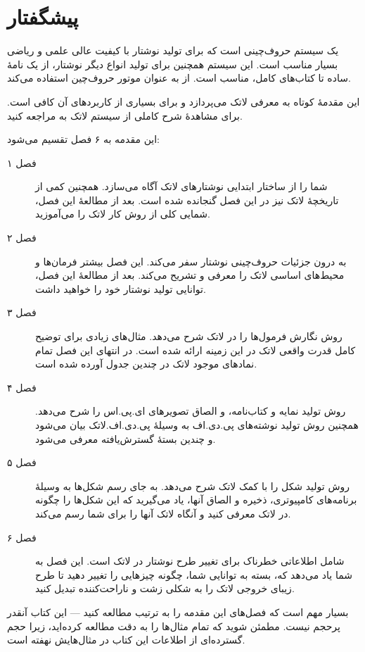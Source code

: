 

\chapter{پیشگفتار}

\lr{\LaTeX{}} \cite{manual}
یک سیستم حروف‌چینی است که برای تولید نوشتار‌‌ با کیفیت عالی علمی و ریاضی بسیار مناسب است. این سیستم همچنین برای تولید انواع دیگر نوشتار‌‌، از یک نامهٔ ساده تا کتاب‌های کامل، مناسب است. 
\lr{\LaTeX}
از 
\lr{\TeX} \cite{texbook}
به عنوان موتور حروف‌چین استفاده می‌کند.

این مقدمهٔ کوتاه به معرفی لاتک می‌پردازد و برای بسیاری از کاربردهای آن کافی است. برای مشاهدهٔ شرح کاملی از سیستم لاتک به 
\cite{manual,companion}
مراجعه کنید.

\bigskip
\noindent 
این مقدمه به ۶ فصل تقسیم می‌شود:
\begin{description}
\item[فصل ۱] 
شما را از ساختار ابتدایی نوشتارهای لاتک آگاه می‌سازد. همچنین کمی از تاریخچهٔ لاتک نیز در این فصل گنجانده شده است. بعد از مطالعهٔ این فصل، شمایی کلی از روش کار لاتک را می‌آموزید.
\item[فصل ۲] 
به درون جزئیات حروف‌چینی نوشتار سفر می‌کند. این فصل بیشتر فرمان‌ها و محیط‌های اساسی لاتک را معرفی و تشریح می‌کند. بعد از مطالعهٔ این فصل، توانایی تولید نوشتار خود را خواهید داشت.
\item[فصل ۳]
روش نگارش فرمول‌ها را در لاتک شرح می‌دهد. مثال‌های زیادی برای توضیح کامل قدرت واقعی لاتک در این زمینه ارائه شده است. در انتهای این فصل تمام نمادهای موجود لاتک  در چندین جدول آورده شده است.
\item[فصل ۴] 
روش تولید نمایه و کتاب‌نامه، و الصاق تصویر‌های ای.پی.اس را شرح می‌دهد. همچنین روش تولید نوشته‌های پی.دی.اف به وسیلهٔ پی.دی.اف.لاتک بیان می‌شود و چندین بستهٔ گسترش‌یافته معرفی می‌شود. 
\item[فصل ۵] 
روش تولید شکل‌ را با کمک لاتک شرح می‌دهد. به جای رسم شکل‌ها به وسیلهٔ برنامه‌های کامپیوتری، ذخیره و الصاق آنها، یاد می‌گیرید که این شکل‌ها را چگونه در لاتک معرفی کنید و آنگاه لاتک آنها را برای شما رسم می‌کند.
\item[فصل ۶] 
شامل اطلاعاتی خطرناک برای تغییر طرح نوشتار در لاتک است. این فصل به شما یاد می‌دهد که، بسته به توانایی شما، چگونه چیز‌هایی را تغییر دهید تا طرح زیبای خروجی لاتک را به شکلی زشت و ناراحت‌کننده تبدیل کنید.
\end{description}
\bigskip
\noindent 
بسیار مهم است که فصل‌های این مقدمه را به ترتیب مطالعه کنید --- این کتاب آنقدر پرحجم نیست. مطمئن شوید که تمام مثال‌ها را به دقت مطالعه کرده‌اید، زیرا حجم گسترده‌ای از اطلاعات این کتاب در مثال‌هایش نهفته است.

